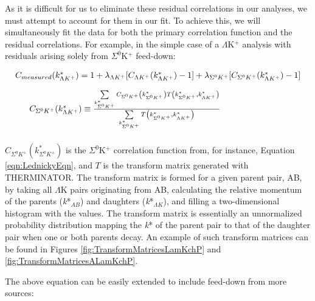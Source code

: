 \documentclass[/home/jesse/Analysis/FemtoAnalysis/AnalysisNotes/AnalysisNoteJBuxton.tex]{subfiles}
\begin{document}
As it is difficult for us to eliminate these residual correlations in our analyses, we must attempt to account for them in our fit.
To achieve this, we will simultaneously fit the data for both the primary correlation function and the residual correlations.  For example, in the simple case of a $\Lambda$K$^{+}$ analysis with residuals arising solely from $\Sigma^{0}$K$^{+}$ feed-down:

\begin{equation}
\begin{array}{l}
\vspace{4mm}
 C_{measured}(k^{*}_{\Lambda K^{+}}) = 1 + \lambda_{\Lambda K^{+}}[C_{\Lambda K^{+}}(k^{*}_{\Lambda K^{+}})-1] + \lambda_{\Sigma^{0}K^{+}}[C_{\Sigma^{0}K^{+}}(k^{*}_{\Lambda K^{+}})-1] \\
\vspace{2mm}
  ~~~~~C_{\Sigma^{0}K^{+}}(k^{*}_{\Lambda K^{+}}) \equiv \frac{\sum\limits_{k^{*}_{\Sigma^{0}K^{+}}} C_{\Sigma^{0}K^{+}}\left(k^{*}_{\Sigma^{0}K^{+}}\right) T\left(k^{*}_{\Sigma^{0}K^{+}},k^{*}_{\Lambda K^{+}}\right)}{\sum\limits_{k^{*}_{\Sigma^{0}K^{+}}} T\left(k^{*}_{\Sigma^{0}K^{+}},k^{*}_{\Lambda K^{+}}\right)}
\end{array} 
\label{eqn:SimpleResiduals}
\end{equation}

$C_{\Sigma^{0}K^{+}}(k^{*}_{\Sigma^{0}K^{+}})$ is the $\Sigma^{0}$K$^{+}$ correlation function from, for instance, Equation \ref{eqn:LednickyEqn}, and $T$ is the transform matrix generated with THERMINATOR.  The transform matrix is formed for a given parent pair, AB, by taking all $\Lambda$K pairs originating from AB, calculating the relative momentum of the parents (\textit{k}*$_{AB}$) and daughters (\textit{k}*$_{\Lambda K}$), and filling a two-dimensional histogram with the values. The transform matrix is essentially an unnormalized probability distribution mapping the \textit{k}* of the parent pair to that of the daughter pair when one or both parents decay.  An example of such transform matrices can be found in Figures \ref{fig:TransformMatricesLamKchP} and \ref{fig:TransformMatricesALamKchP}.

  The above equation can be easily extended to include feed-down from more sources:
\end{document}
